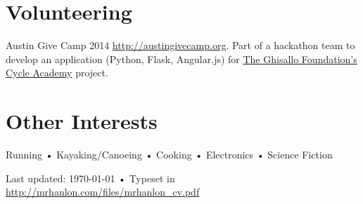 \documentclass[10pt, a4paper]{article}
\begin{document}
\section*{Volunteering}
Austin Give Camp 2014 \href{http://austingivecamp.org}{http://austingivecamp.org}. Part of a hackathon team to develop an application (Python, Flask, Angular.js) for \href{http://ghisallo.org/}{The Ghisallo Foundation's} \href{http://cycleacademy.org/}{Cycle Academy} project.

\section*{Other Interests}
Running • Kayaking/Canoeing • Cooking • Electronics • Science Fiction


\vfill{}

\begin{center}
{\scriptsize  Last updated: \today\- •\-
Typeset in \href{http://nitens.org/taraborelli/cvtex}{
\XeTeX }\\
\href{http://mrhanlon.com/files/mrhanlon_cv.pdf}{http://mrhanlon.com/files/mrhanlon\_cv.pdf}}
\end{center}
\end{document}
